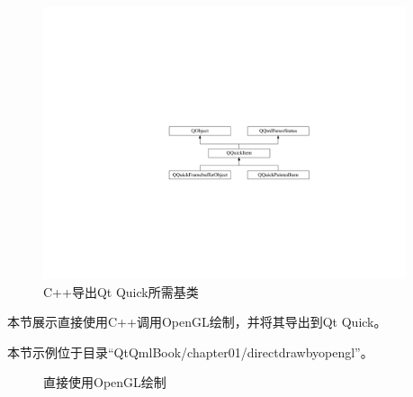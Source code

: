\begin{figure}[htb] %
\marginnote{\setlength\fboxsep{2pt}\fbox{\footnotesize{\kaishu\figurename\,}\footnotesize{\ref{p000010}}}}\centering %
\includegraphics[width=0.95\textwidth]{chapter01/images/qtquick_item.pdf} %
\caption{C{\sourcefonttwo{}+}{\sourcefonttwo{}+}导出Qt Quick所需基类} %
\label{p000010} %
\end{figure}


本节展示直接使用C{\sourcefonttwo{}+}{\sourcefonttwo{}+}调用OpenGL绘制，并将其导出到Qt Quick。

本节示例位于目录“QtQmlBook/chapter01/directdrawbyopengl”。

\begin{figure}[htb] %
\marginnote{\setlength\fboxsep{2pt}\fbox{\footnotesize{\kaishu\figurename\,}\footnotesize{\ref{p000011}}}}\centering %
\setlength\fboxsep{0pt} %
\caption{直接使用OpenGL绘制} %
\label{p000011} %
\end{figure}


